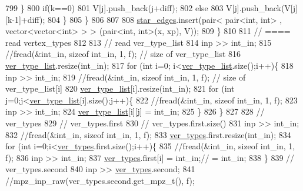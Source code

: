 \begin{DoxyCode}
799         \}
800         \textcolor{keywordflow}{if}(k==0)
801           V[j].push\_back(j+diff);
802         \textcolor{keywordflow}{else}
803           V[j].push\_back(V[j][k-1]+diff);
804       \}
805     \}
806 
807 
808     \hyperlink{classmarked__graph__compressed_a7df5779d313486644132bd816937f532}{star\_edges}.insert(pair< pair<int, int> , vector<vector<int> > > (pair<int, int>(x, xp), V));
809   \}
810 
811   \textcolor{comment}{// ==== read vertex\_types}
812 
813   \textcolor{comment}{// read ver\_type\_list}
814   inp >> int\_in;
815   \textcolor{comment}{//fread(&int\_in, sizeof int\_in, 1, f); // size of ver\_type\_list}
816   \hyperlink{classmarked__graph__compressed_af2e3e55223d436628a02758dfae88493}{ver\_type\_list}.resize(int\_in);
817   \textcolor{keywordflow}{for} (\textcolor{keywordtype}{int} i=0; i<\hyperlink{classmarked__graph__compressed_af2e3e55223d436628a02758dfae88493}{ver\_type\_list}.size();i++)\{
818     inp >> int\_in;
819     \textcolor{comment}{//fread(&int\_in, sizeof int\_in, 1, f); // size of ver\_type\_list[i]}
820     \hyperlink{classmarked__graph__compressed_af2e3e55223d436628a02758dfae88493}{ver\_type\_list}[i].resize(int\_in);
821     \textcolor{keywordflow}{for} (\textcolor{keywordtype}{int} j=0;j<\hyperlink{classmarked__graph__compressed_af2e3e55223d436628a02758dfae88493}{ver\_type\_list}[i].size();j++)\{
822       \textcolor{comment}{//fread(&int\_in, sizeof int\_in, 1, f);}
823       inp >> int\_in;
824       \hyperlink{classmarked__graph__compressed_af2e3e55223d436628a02758dfae88493}{ver\_type\_list}[i][j] = int\_in;
825     \}
826   \}
827 
828   \textcolor{comment}{// ver\_types}
829   \textcolor{comment}{// ver\_types.first}
830   \textcolor{comment}{// ver\_types.first.size()}
831   inp >> int\_in;
832   \textcolor{comment}{//fread(&int\_in, sizeof int\_in, 1, f);}
833   \hyperlink{classmarked__graph__compressed_af446cc5e23c241a92b76642fd5ebc403}{ver\_types}.first.resize(int\_in);
834   \textcolor{keywordflow}{for} (\textcolor{keywordtype}{int} i=0;i<\hyperlink{classmarked__graph__compressed_af446cc5e23c241a92b76642fd5ebc403}{ver\_types}.first.size();i++)\{
835     \textcolor{comment}{//fread(&int\_in, sizeof int\_in, 1, f);}
836     inp >> int\_in;
837     \hyperlink{classmarked__graph__compressed_af446cc5e23c241a92b76642fd5ebc403}{ver\_types}.first[i] = int\_in;\textcolor{comment}{// = int\_in;}
838   \}
839   \textcolor{comment}{// ver\_types.second}
840   inp >> \hyperlink{classmarked__graph__compressed_af446cc5e23c241a92b76642fd5ebc403}{ver\_types}.second;
841   \textcolor{comment}{//mpz\_inp\_raw(ver\_types.second.get\_mpz\_t(), f);}

\end{DoxyCode}
